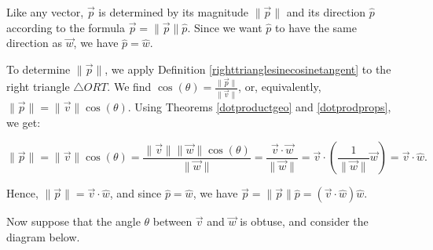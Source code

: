 \documentclass{ximera}
\begin{document}
 

Like any vector, $\overrightarrow{p}$ is determined by its magnitude $\| \overrightarrow{p} \|$ and its direction $\hat{p}$ according to the formula $\overrightarrow{p} = \| \overrightarrow{p} \| \hat{p}$.  Since we want $\hat{p}$ to have the same direction as $\overrightarrow{w}$, we have $\hat{p} = \hat{w}$.  

 

To determine $\| \overrightarrow{p} \|$, we apply Definition \ref{righttrianglesinecosinetangent}  to the right triangle $\triangle ORT$.  We find $\cos(\theta) = \frac{\| \overrightarrow{p} \|}{\| \overrightarrow{v} \|}$, or, equivalently, $\| \overrightarrow{p} \| = \| \overrightarrow{v} \| \cos(\theta)$.  Using Theorems \ref{dotproductgeo} and \ref{dotprodprops}, we get:

 \[ \| \overrightarrow{p} \| = \| \overrightarrow{v} \| \cos(\theta) = \frac{ \| \overrightarrow{v} \| \| \overrightarrow{w} \| \cos(\theta)}{\| \overrightarrow{w} \|} = \frac{\overrightarrow{v} \cdot \overrightarrow{w}}{\|\overrightarrow{w}\|} =  \overrightarrow{v} \cdot \left(\frac{1}{\|\overrightarrow{w}\|} \overrightarrow{w}\right) = \overrightarrow{v} \cdot \hat{w}.\]

 

Hence, $\| \overrightarrow{p} \| = \overrightarrow{v} \cdot \hat{w}$, and since $\hat{p} = \hat{w}$, we have $\overrightarrow{p} = \| \overrightarrow{p} \| \hat{p} = (\overrightarrow{v} \cdot \hat{w}) \hat{w}$.

 

Now suppose that the angle $\theta$ between $\overrightarrow{v}$ and $\overrightarrow{w}$ is obtuse, and consider the diagram below. 

 
\end{document}
